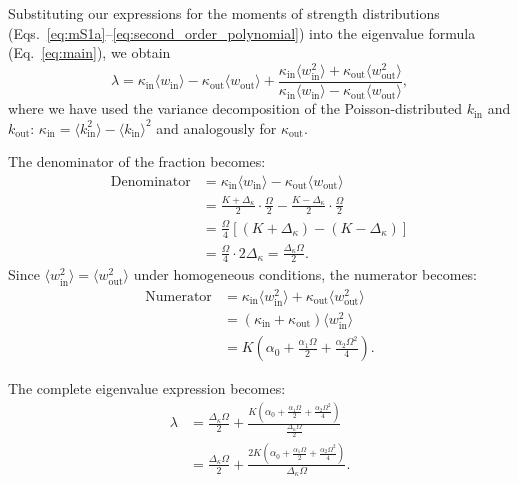 \documentclass[a4paper,pre,superscriptaddress,floatfix,nofootinbib,twocolumn]{revtex4-1}
\begin{document}
Substituting our expressions for the moments of strength distributions (Eqs.~\eqref{eq:mS1a}--\eqref{eq:second_order_polynomial}) into the eigenvalue formula (Eq.~\eqref{eq:main}), we obtain
\begin{equation*}
\lambda = \kappa_\text{in} \langle w_\text{in} \rangle - \kappa_\text{out} \langle w_\text{out} \rangle + \frac{\kappa_\text{in} \langle w^2_\text{in} \rangle + \kappa_\text{out} \langle w^2_\text{out} \rangle}{\kappa_\text{in} \langle w_\text{in} \rangle - \kappa_\text{out} \langle w_\text{out} \rangle},
\end{equation*}
where we have used the variance decomposition of the Poisson-distributed $k_{\text{in}}$ and $k_{\text{out}}$: $\kappa_\text{in} = \langle k_{\text{in}}^2 \rangle - \langle k_{\text{in}} \rangle^2$ and analogously for $\kappa_\text{out}$.

The denominator of the fraction becomes:
\begin{align*}
\text{Denominator} &= \kappa_\text{in} \langle w_\text{in} \rangle - \kappa_\text{out} \langle w_\text{out} \rangle\\
&= \frac{K + \Delta_\kappa}{2} \cdot \frac{\Omega}{2} - \frac{K - \Delta_\kappa}{2} \cdot \frac{\Omega}{2}\\
&= \frac{\Omega}{4}\left[(K + \Delta_\kappa) - (K - \Delta_\kappa)\right]\\
&= \frac{\Omega}{4} \cdot 2\Delta_\kappa = \frac{\Delta_\kappa \Omega}{2}.
\end{align*}
Since $\langle w^2_\text{in} \rangle = \langle w^2_\text{out} \rangle$ under homogeneous conditions, the numerator becomes:
\begin{align*}
\text{Numerator} &= \kappa_\text{in} \langle w^2_\text{in} \rangle + \kappa_\text{out} \langle w^2_\text{out} \rangle\\
&= (\kappa_\text{in} + \kappa_\text{out}) \langle w^2_\text{in} \rangle\\
&= K \left(\alpha_0 + \frac{\alpha_1 \Omega}{2} + \frac{\alpha_2 \Omega^2}{4}\right).
\end{align*}

The complete eigenvalue expression becomes:
\begin{align*}
\lambda &= \frac{\Delta_\kappa \Omega}{2} + \frac{K \left(\alpha_0 + \frac{\alpha_1 \Omega}{2} + \frac{\alpha_2 \Omega^2}{4}\right)}{\frac{\Delta_\kappa \Omega}{2}}\\
&= \frac{\Delta_\kappa \Omega}{2} + \frac{2K \left(\alpha_0 + \frac{\alpha_1 \Omega}{2} + \frac{\alpha_2 \Omega^2}{4}\right)}{\Delta_\kappa \Omega}.
\end{align*}
\end{document}

